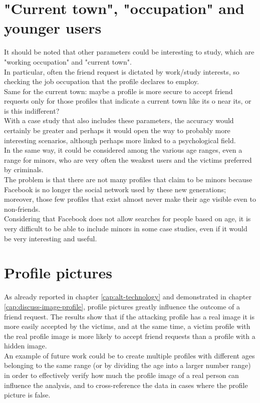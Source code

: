 \section{"Current town", "occupation" and younger users}
It should be noted that other parameters could be interesting to study, which are "working occupation" and "current town". \\
In particular, often the friend request is dictated by work/study interests, so checking the job occupation that the profile declares to employ. \\
Same for the current town: maybe a profile is more secure to accept friend requests only for those profiles that indicate a current town like its o near its, or is this indifferent?\\
With a case study that also includes these parameters, the accuracy would certainly be greater and perhaps it would open the way to probably more interesting scenarios, although perhaps more linked to a psychological field.\\
In the same way, it could be considered among the various age ranges, even a range for minors, who are very often the weakest users and the victims preferred by criminals.\\The problem is that there are not many profiles that claim to be minors because Facebook is no longer the social network used by these new generations; moreover, those few profiles that exist almost never make their age visible even to non-friends.\\
Considering that Facebook does not allow searches for people based on age, it is very difficult to be able to include minors in some case studies, even if it would be very interesting and useful.

\section{Profile pictures}
As already reported in chapter \ref{cap:alt-technology} and demonstrated in chapter \ref{cap:discuss-image-profile}, profile pictures greatly influence the outcome of a friend request. The results show that if the attacking profile has a real image it is more easily accepted by the victims, and at the same time, a victim profile with the real profile image is more likely to accept friend requests than a profile with a hidden image.\\
An example of future work could be to create multiple profiles with different ages belonging to the same range (or by dividing the age into a larger number range) in order to effectively verify how much the profile image of a real person can influence the analysis, and to cross-reference the data in cases where the profile picture is false.

